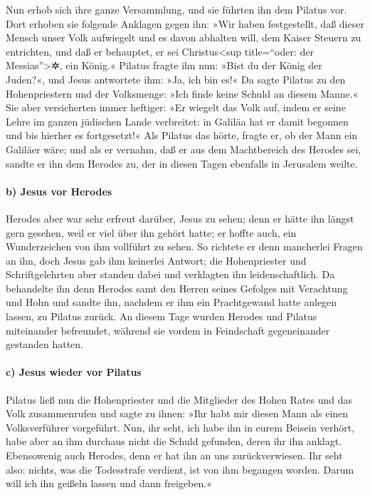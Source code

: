  Nun erhob sich ihre ganze Versammlung, und sie führten
ihn dem Pilatus vor.  Dort erhoben sie folgende Anklagen
gegen ihn: »Wir haben festgestellt, daß dieser Mensch unser Volk
aufwiegelt und es davon abhalten will, dem Kaiser Steuern zu entrichten,
und daß er behauptet, er sei Christus\textless sup title=``oder: der
Messias''\textgreater✲, ein König.«  Pilatus fragte ihn
nun: »Bist du der König der Juden?«, und Jesus antwortete ihm: »Ja, ich
bin es!«  Da sagte Pilatus zu den Hohenpriestern und der
Volksmenge: »Ich finde keine Schuld an diesem Manne.«  Sie
aber versicherten immer heftiger: »Er wiegelt das Volk auf, indem er
seine Lehre im ganzen jüdischen Lande verbreitet: in Galiläa hat er
damit begonnen und bis hierher es fortgesetzt!«  Als
Pilatus das hörte, fragte er, ob der Mann ein Galiläer wäre;
 und als er vernahm, daß er aus dem Machtbereich des
Herodes sei, sandte er ihn dem Herodes zu, der in diesen Tagen ebenfalls
in Jerusalem weilte.

\hypertarget{b-jesus-vor-herodes}{%
\paragraph{b) Jesus vor Herodes}\label{b-jesus-vor-herodes}}

 Herodes aber war sehr erfreut darüber, Jesus zu sehen;
denn er hätte ihn längst gern gesehen, weil er viel über ihn gehört
hatte; er hoffte auch, ein Wunderzeichen von ihm vollführt zu sehen.
 So richtete er denn mancherlei Fragen an ihn, doch Jesus
gab ihm keinerlei Antwort;  die Hohenpriester und
Schriftgelehrten aber standen dabei und verklagten ihn leidenschaftlich.
 Da behandelte ihn denn Herodes samt den Herren seines
Gefolges mit Verachtung und Hohn und sandte ihn, nachdem er ihm ein
Prachtgewand hatte anlegen lassen, zu Pilatus zurück.  An
diesem Tage wurden Herodes und Pilatus miteinander befreundet, während
sie vordem in Feindschaft gegeneinander gestanden hatten.

\hypertarget{c-jesus-wieder-vor-pilatus}{%
\paragraph{c) Jesus wieder vor
Pilatus}\label{c-jesus-wieder-vor-pilatus}}

 Pilatus ließ nun die Hohenpriester und die Mitglieder
des Hohen Rates und das Volk zusammenrufen  und sagte zu
ihnen: »Ihr habt mir diesen Mann als einen Volksverführer vorgeführt.
Nun, ihr seht, ich habe ihn in eurem Beisein verhört, habe aber an ihm
durchaus nicht die Schuld gefunden, deren ihr ihn anklagt.
 Ebensowenig auch Herodes, denn er hat ihn an uns
zurückverwiesen. Ihr seht also: nichts, was die Todesstrafe verdient,
ist von ihm begangen worden.  Darum will ich ihn geißeln
lassen und dann freigeben.«

